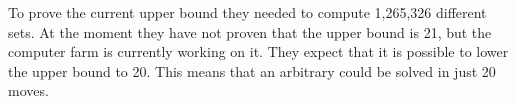 To prove the current upper bound they needed to compute 1,265,326 different sets. 
At the moment they have not proven that the upper bound is 21, but the computer farm is currently working on it. They expect that it is possible to lower the upper bound to 20. 
This means that an arbitrary \rubik{} could be solved in just 20 moves.


\begin{comment}
The progression greatly accelerated when that set solver proved the first upper bound of 25 moves. This was done on home computers from October 2007 to March 2008. They only needed to solve 6000 sets, but after this they got contacted by John Welborn from Sony Pictures Imageworks and he offered a lot of idle computers from a computer farm to help on the project. 

The set solver created by Thomas Rockicki, which was described in the previous section will now be further described.


The set solver has a special way of testing the \rubik{}s. It does not solve them to the unit position $e$, instead it finds a move sequence for a subgroup of the \rubik{} this way it can solve approximately 19.5 billion cubes at a time and not just one. The reason for this is that if you relabel an arbitrary cube, that given cube can be unlabeled to approximately 19.5 billion different cube positions. Recall that there are approximately 19.5 billion positions in the set \m{H} and all these positions are equal to $e$ when relabeled. The same logic applies to any other given position.
\end{comment}